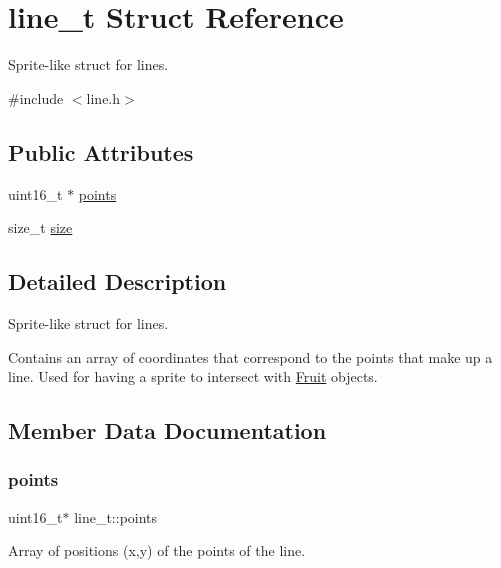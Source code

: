 \hypertarget{structline__t}{}\section{line\+\_\+t Struct Reference}
\label{structline__t}


Sprite-\/like struct for lines.  




{\ttfamily \#include $<$line.\+h$>$}

\subsection*{Public Attributes}
\begin{DoxyCompactItemize}
\item 
uint16\+\_\+t $\ast$ \hyperlink{structline__t_a410d920033ad285991070abdea4f4d98}{points}
\item 
size\+\_\+t \hyperlink{structline__t_a0608078c3b7652081a8bf6923fc9299d}{size}
\end{DoxyCompactItemize}


\subsection{Detailed Description}
Sprite-\/like struct for lines. 

Contains an array of coordinates that correspond to the points that make up a line. Used for having a sprite to intersect with \hyperlink{structFruit}{Fruit} objects. 

\subsection{Member Data Documentation}
\mbox{\label{structline__t_a410d920033ad285991070abdea4f4d98}} 
\subsubsection{\texorpdfstring{points}{points}}
{\footnotesize\ttfamily uint16\+\_\+t$\ast$ line\+\_\+t\+::points}

Array of positions (x,y) of the points of the line. \mbox{\label{structline__t_a0608078c3b7652081a8bf6923fc9299d}} 
